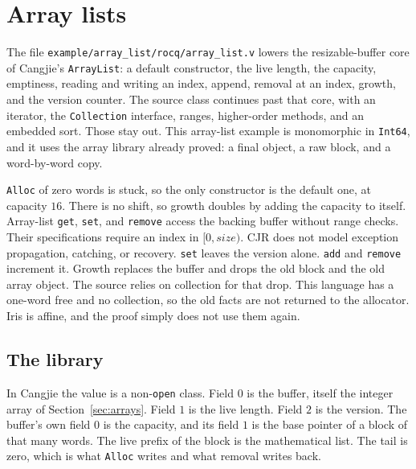 \documentclass[11pt]{article}
\begin{document}


\section{Array lists}
\label{sec:array-lists}

The file \texttt{example/array\_list/rocq/array\_list.v} lowers the resizable-buffer core of Cangjie's \texttt{ArrayList}: a default constructor, the live length, the capacity, emptiness, reading and writing an index, append, removal at an index, growth, and the version counter.
The source class continues past that core, with an iterator, the \texttt{Collection} interface, ranges, higher-order methods, and an embedded sort.
Those stay out.
This array-list example is monomorphic in \texttt{Int64}, and it uses the array library already proved: a final object, a raw block, and a word-by-word copy.

\texttt{Alloc} of zero words is stuck, so the only constructor is the default one, at capacity \(16\).
There is no shift, so growth doubles by adding the capacity to itself.
Array-list \texttt{get}, \texttt{set}, and \texttt{remove} access the backing
buffer without range checks. Their specifications require an index in
\([0, \mathit{size})\). CJR does not model exception propagation,
catching, or recovery.
\texttt{set} leaves the version alone.
\texttt{add} and \texttt{remove} increment it.
Growth replaces the buffer and drops the old block and the old array object.
The source relies on collection for that drop.
This language has a one-word free and no collection, so the old facts are not returned to the allocator.
Iris is affine, and the proof simply does not use them again.

\subsection{The library}

In Cangjie the value is a non-\texttt{open} class.
Field \(0\) is the buffer, itself the integer array of Section~\ref{sec:arrays}.
Field \(1\) is the live length.
Field \(2\) is the version.
The buffer's own field \(0\) is the capacity, and its field \(1\) is the base pointer of a block of that many words.
The live prefix of the block is the mathematical list.
The tail is zero, which is what \texttt{Alloc} writes and what removal writes back.


\end{document}
